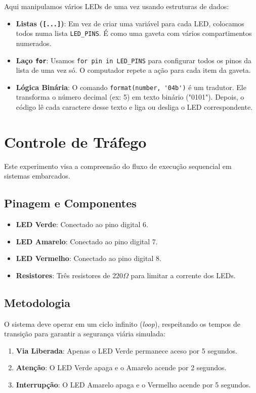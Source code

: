 \documentclass[lang=pt,11pt]{elegantbook}
\begin{document}
Aqui manipulamos vários LEDs de uma vez usando estruturas de dados:

\begin{itemize}
    \item \textbf{Listas (\lstinline{[...]})}: Em vez de criar uma variável para cada LED, colocamos todos numa lista \lstinline{LED_PINS}. É como uma gaveta com vários compartimentos numerados.
    \item \textbf{Laço \lstinline{for}}: Usamos \lstinline{for pin in LED_PINS} para configurar todos os pinos da lista de uma vez só. O computador repete a ação para cada item da gaveta.
    \item \textbf{Lógica Binária}: O comando \lstinline{format(number, '04b')} é um tradutor. Ele transforma o número decimal (ex: 5) em texto binário ("0101"). Depois, o código lê cada caractere desse texto e liga ou desliga o LED correspondente.
\end{itemize}

\section{Controle de Tráfego}

Este experimento visa a compreensão do fluxo de execução sequencial em sistemas embarcados.

\subsection{Pinagem e Componentes}
\begin{itemize}
    \item \textbf{LED Verde}: Conectado ao pino digital 6.
    \item \textbf{LED Amarelo}: Conectado ao pino digital 7.
    \item \textbf{LED Vermelho}: Conectado ao pino digital 8.
    \item \textbf{Resistores}: Três resistores de $220\Omega$ para limitar a corrente dos LEDs.
\end{itemize}

\subsection{Metodologia}
O sistema deve operar em um ciclo infinito (\textit{loop}), respeitando os tempos de transição para garantir a segurança viária simulada:
\begin{enumerate}
    \item \textbf{Via Liberada}: Apenas o LED Verde permanece aceso por 5 segundos.
    \item \textbf{Atenção}: O LED Verde apaga e o Amarelo acende por 2 segundos.
    \item \textbf{Interrupção}: O LED Amarelo apaga e o Vermelho acende por 5 segundos.
\end{enumerate}
\end{document}
